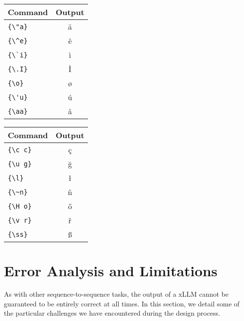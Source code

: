 \documentclass[11pt]{article}
\newcommand{\todo}[1]{\textcolor{red}{TODO: #1}}
\begin{document}
\begin{table*}
\centering
\begin{tabular}{lc}
\hline
\textbf{Command} & \textbf{Output}\\
\hline
\verb|{\"a}| & {\"a} \\
\verb|{\^e}| & {\^e} \\
\verb|{\`i}| & {\`i} \\ 
\verb|{\.I}| & {\.I} \\ 
\verb|{\o}| & {\o} \\
\verb|{\'u}| & {\'u}  \\ 
\verb|{\aa}| & {\aa}  \\\hline
\end{tabular}
\begin{tabular}{lc}
\hline
\textbf{Command} & \textbf{Output}\\
\hline
\verb|{\c c}| & {\c c} \\ 
\verb|{\u g}| & {\u g} \\ 
\verb|{\l}| & {\l} \\ 
\verb|{\~n}| & {\~n} \\ 
\verb|{\H o}| & {\H o} \\ 
\verb|{\v r}| & {\v r} \\ 
\verb|{\ss}| & {\ss} \\
\hline
\end{tabular}
\caption{Results on the English language test set of the TSAR shared task. Listed are our own results (\emph{UniHD}), the two best-performing competing systems~\todo{include}, as well as provided baselines~\todo{name them and cite the relevant paper}.}
\label{tab:accents}
\end{table*}


\section{Error Analysis and Limitations}

As with other sequence-to-sequence tasks, the output of a xLLM cannot be guaranteed to be entirely correct at all times.
In this section, we detail some of the particular challenges we have encountered during the design process.
\end{document}
